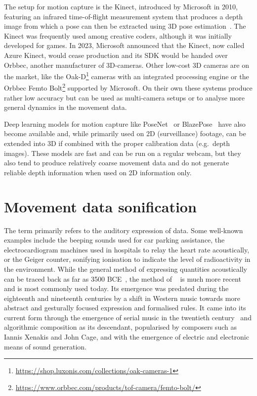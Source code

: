 The  setup for motion capture is the Kinect, introduced by Microsoft in 2010, featuring an infrared time-of-flight measurement system that produces a depth image from which a pose can then be extracted using \ac{3D} pose estimation~\parencite[see][]{poseEstimationPaper}.
The Kinect was frequently used among creative coders, although it was initially developed for games.
In 2023, Microsoft announced that the Kinect, now called Azure Kinect, would cease production and its \ac{SDK} would be handed over Orbbec, another manufacturer of \ac{3D}-cameras.
Other low-cost 3D cameras are on the market, like the Oak-D\footnote{\url{https://shop.luxonis.com/collections/oak-cameras-1}} cameras with an integrated processing engine or the Orbbec Femto Bolt\footnote{\url{https://www.orbbec.com/products/tof-camera/femto-bolt/}} supported by Microsoft.
On their own these systems produce rather low accuracy but can be used as multi-camera setups or to analyse more general dynamics in the movement data.

Deep learning models for motion capture like PoseNet~\parencite{kendall2016posenet} or BlazePose~\parencite{bazarevsky2020blazepose} have also become available and, while primarily used on \ac{2D} (surveillance) footage, can be extended into \ac{3D} if combined with the proper calibration data (e.g.\ depth images).
These models are fast and can be run on a regular webcam, but they also tend to produce relatively coarse movement data and do not generate reliable depth information when used on \ac{2D} information only.

\section{Movement data sonification}
\label{sec:movement-data-sonification}

The term  primarily refers to the auditory expression of data.
Some well-known examples include the beeping sounds used for car parking assistance, the electrocardiogram machines used in hospitals to relay the heart rate acoustically, or the Geiger counter, sonifying ionisation to indicate the level of radioactivity in the environment.
While the general method of expressing quantities acoustically can be traced back as far as 3500 BCE~\parencite[178]{sonificationPreHistory}, the method of ~\parencite[Chapter~15]{sonificationHandbook} is much more recent and is most commonly used today.
Its emergence was predated during the eighteenth and nineteenth centuries by a shift in Western music towards more abstract and gesturally focused expression and formalised rules.
It came into its current form through the emergence of serial music in the twentieth century~\parencite[179-180]{sonificationPreHistory} and algorithmic composition as its descendant, popularised by composers such as Iannis Xenakis and John Cage, and with the emergence of electric and electronic means of sound generation.


